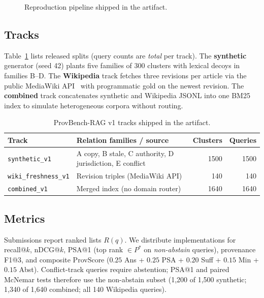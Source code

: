 \documentclass[sigconf]{acmart}
\begin{document}
\begin{figure}[t]
\centering
{}
\caption{Reproduction pipeline shipped in the artifact.}
\label{fig:pipeline}
\end{figure}

\subsection{Tracks}
Table~\ref{tab:tracks} lists released splits (query counts are \emph{total} per track).
The \textbf{synthetic} generator (seed 42) plants five families of 300 clusters with lexical decoys in families B--D.
The \textbf{Wikipedia} track fetches three revisions per article via the public MediaWiki API~\cite{wiki_api} with programmatic gold on the newest revision.
The \textbf{combined} track concatenates synthetic and Wikipedia JSONL into one BM25 index to simulate heterogeneous corpora without routing.

\begin{table}[t]
  \centering
  \small
  \caption{ProvBench-RAG v1 tracks shipped in the artifact.}
  \label{tab:tracks}
  \begin{tabular}{lp{2.6cm}rr}
  \toprule
  Track & Relation families / source & Clusters & Queries \\
  \midrule
  \texttt{synthetic\_v1} & A copy, B stale, C authority, D jurisdiction, E conflict & 1500 & 1500 \\
  \texttt{wiki\_freshness\_v1} & Revision triples (MediaWiki API) & 140 & 140 \\
  \texttt{combined\_v1} & Merged index (no domain router) & 1640 & 1640 \\
  \bottomrule
  \end{tabular}
\end{table}

\subsection{Metrics}
Submissions report ranked lists $R(q)$.
We distribute implementations for recall@$k$, nDCG@$k$, PSA@1 (top rank $\in P^\ast$ on \emph{non-abstain} queries), provenance F1@3, and composite ProvScore ($0.25$ Ans + $0.25$ PSA + $0.20$ Suff + $0.15$ Min + $0.15$ Abst).
Conflict-track queries require abstention; PSA@1 and paired McNemar tests therefore use the non-abstain subset (1,200 of 1,500 synthetic; 1,340 of 1,640 combined; all 140 Wikipedia queries).
\end{document}
